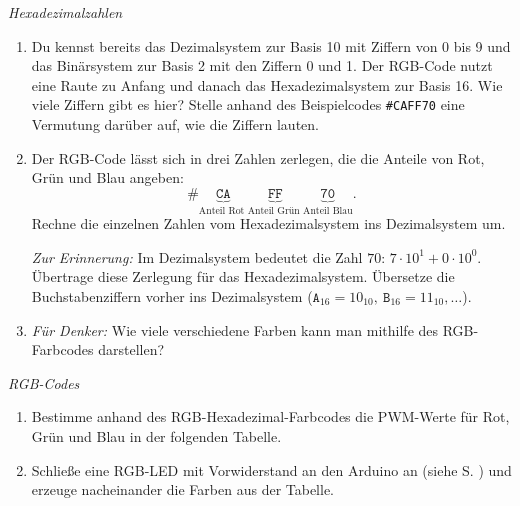 \begin{aufgabe} \emph{Hexadezimalzahlen}
	\begin{enumerate}[label=\alph*), itemsep=0ex, parsep=0ex]
		\item Du kennst bereits das Dezimalsystem zur Basis 10 mit Ziffern von 0 bis 9 und das Binärsystem zur Basis 2 mit den Ziffern 0 und 1. Der RGB-Code nutzt eine Raute zu Anfang und danach das Hexadezimalsystem zur Basis 16. Wie viele Ziffern gibt es hier? Stelle anhand des Beispielcodes \texttt{\#CAFF70} eine Vermutung darüber auf, wie die Ziffern lauten.
		\item Der RGB-Code lässt sich in drei Zahlen zerlegen, die die Anteile von Rot, Grün und Blau angeben:
		\begin{equation*}
			 \# \underbrace{\texttt{CA}}_{\text{Anteil Rot~}} \underbrace{\texttt{FF}}_{\text{Anteil Grün~}} \underbrace{\texttt{70}}_{\text{Anteil Blau}}.
		\end{equation*}
		Rechne die einzelnen Zahlen vom Hexadezimalsystem ins Dezimalsystem um.
		
		\emph{Zur Erinnerung:} Im Dezimalsystem bedeutet die Zahl $70$: $7\cdot 10^1 + 0 \cdot 10^0$. Übertrage diese Zerlegung für das Hexadezimalsystem. Übersetze die Buchstabenziffern vorher ins Dezimalsystem ($\texttt{A}_{16}=10_{10},~ \texttt{B}_{16}=11_{10}, \dots$).
		\item \emph{Für Denker:} Wie viele verschiedene Farben kann man mithilfe des RGB-Farbcodes darstellen?
	\end{enumerate}
\end{aufgabe}

\begin{aufgabe} \emph{RGB-Codes}
	\begin{enumerate}[label=\alph*), itemsep=0ex, parsep=0ex]
		\item Bestimme anhand des RGB-Hexadezimal-Farbcodes die PWM-Werte für Rot, Grün und Blau in der folgenden Tabelle.
		\item Schließe eine RGB-LED mit Vorwiderstand an den Arduino an (siehe S. \pageref{proj:rgbled1}) und erzeuge nacheinander die Farben aus der Tabelle.
	\end{enumerate}
\end{aufgabe}

